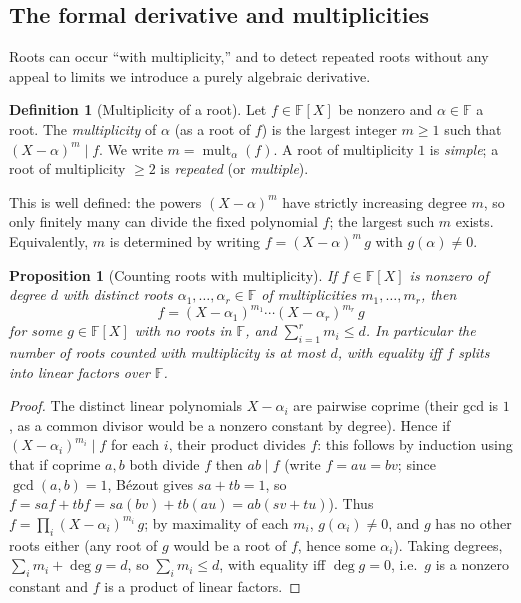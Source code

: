 \documentclass[11pt,a4paper]{article}
\newtheorem{proposition}[theorem]{Proposition}
\theoremstyle{definition}
\newtheorem{definition}[theorem]{Definition}
\theoremstyle{remark}
\newcommand{\F}{\ensuremath{\mathbb{F}}}
\begin{document}
\subsection{The formal derivative and multiplicities}
\label{polynomials:subsec:derivative}

Roots can occur ``with multiplicity,'' and to detect repeated roots without any
appeal to limits we introduce a purely algebraic derivative.

\begin{definition}[Multiplicity of a root]\label{polynomials:def:multiplicity}
Let \(f \in \F[X]\) be nonzero and \(\alpha \in \F\) a root. The
\emph{multiplicity} of \(\alpha\) (as a root of \(f\)) is the largest integer
\(m \ge 1\) such that \((X - \alpha)^m \mid f\). We write \(m = \operatorname{mult}_\alpha(f)\).
A root of multiplicity \(1\) is \emph{simple}; a root of multiplicity \(\ge 2\)
is \emph{repeated} (or \emph{multiple}).
\end{definition}

This is well defined: the powers \((X - \alpha)^m\) have strictly increasing
degree \(m\), so only finitely many can divide the fixed polynomial \(f\); the
largest such \(m\) exists. Equivalently, \(m\) is determined by writing
\(f = (X - \alpha)^m\, g\) with \(g(\alpha) \neq 0\).

\begin{proposition}[Counting roots with multiplicity]
\label{polynomials:prop:roots-with-mult}
If \(f \in \F[X]\) is nonzero of degree \(d\) with distinct roots
\(\alpha_1, \dots, \alpha_r \in \F\) of multiplicities \(m_1, \dots, m_r\), then
\[
  f = (X - \alpha_1)^{m_1} \cdots (X - \alpha_r)^{m_r}\, g
\]
for some \(g \in \F[X]\) with no roots in \(\F\), and
\(\sum_{i=1}^r m_i \le d\). In particular the number of roots \emph{counted with
multiplicity} is at most \(d\), with equality iff \(f\) splits into linear
factors over \(\F\).
\end{proposition}

\begin{proof}
The distinct linear polynomials \(X - \alpha_i\) are pairwise coprime (their gcd
is \(1\), as a common divisor would be a nonzero constant by degree). Hence if
\((X - \alpha_i)^{m_i} \mid f\) for each \(i\), their product divides \(f\): this
follows by induction using that if coprime \(a, b\) both divide \(f\) then
\(ab \mid f\) (write \(f = a u = b v\); since \(\gcd(a,b)=1\), B\'ezout gives
\(sa + tb = 1\), so \(f = saf + tbf = sa(bv) + tb(au) = ab(sv + tu)\)). Thus
\(f = \prod_i (X - \alpha_i)^{m_i}\, g\); by maximality of each \(m_i\),
\(g(\alpha_i) \neq 0\), and \(g\) has no other roots either (any root of \(g\)
would be a root of \(f\), hence some \(\alpha_i\)). Taking degrees,
\(\sum_i m_i + \deg g = d\), so \(\sum_i m_i \le d\), with equality iff
\(\deg g = 0\), i.e.\ \(g\) is a nonzero constant and \(f\) is a product of
linear factors.
\end{proof}
\end{document}
